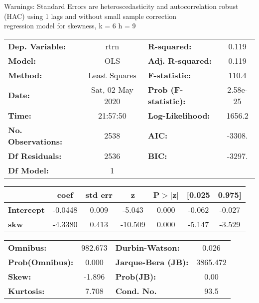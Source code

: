 Warnings: \newline
 [1] Standard Errors are heteroscedasticity and autocorrelation robust (HAC) using 1 lags and without small sample correction\\ 

regression model for skewness, k = 6 h = 9\begin{center}
\begin{tabular}{lclc}
\toprule
\textbf{Dep. Variable:}    &       rtrn       & \textbf{  R-squared:         } &     0.119   \\
\textbf{Model:}            &       OLS        & \textbf{  Adj. R-squared:    } &     0.119   \\
\textbf{Method:}           &  Least Squares   & \textbf{  F-statistic:       } &     110.4   \\
\textbf{Date:}             & Sat, 02 May 2020 & \textbf{  Prob (F-statistic):} &  2.58e-25   \\
\textbf{Time:}             &     21:57:50     & \textbf{  Log-Likelihood:    } &    1656.2   \\
\textbf{No. Observations:} &        2538      & \textbf{  AIC:               } &    -3308.   \\
\textbf{Df Residuals:}     &        2536      & \textbf{  BIC:               } &    -3297.   \\
\textbf{Df Model:}         &           1      & \textbf{                     } &             \\
\bottomrule
\end{tabular}
\begin{tabular}{lcccccc}
                   & \textbf{coef} & \textbf{std err} & \textbf{z} & \textbf{P$> |$z$|$} & \textbf{[0.025} & \textbf{0.975]}  \\
\midrule
\textbf{Intercept} &      -0.0448  &        0.009     &    -5.043  &         0.000        &       -0.062    &       -0.027     \\
\textbf{skw}       &      -4.3380  &        0.413     &   -10.509  &         0.000        &       -5.147    &       -3.529     \\
\bottomrule
\end{tabular}
\begin{tabular}{lclc}
\textbf{Omnibus:}       & 982.673 & \textbf{  Durbin-Watson:     } &    0.026  \\
\textbf{Prob(Omnibus):} &   0.000 & \textbf{  Jarque-Bera (JB):  } & 3865.472  \\
\textbf{Skew:}          &  -1.896 & \textbf{  Prob(JB):          } &     0.00  \\
\textbf{Kurtosis:}      &   7.708 & \textbf{  Cond. No.          } &     93.5  \\
\bottomrule
\end{tabular}
\end{center}

